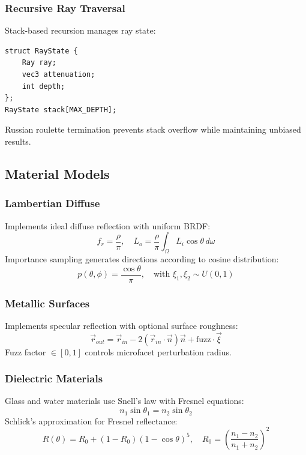 \documentclass[conference]{IEEEtran}
\begin{document}
\subsubsection{Recursive Ray Traversal}
Stack-based recursion manages ray state:
\begin{lstlisting}
struct RayState {
    Ray ray;
    vec3 attenuation;
    int depth;
};
RayState stack[MAX_DEPTH];
\end{lstlisting}
Russian roulette termination prevents stack overflow while maintaining unbiased results.

\subsection{Material Models}

\subsubsection{Lambertian Diffuse}
Implements ideal diffuse reflection with uniform BRDF:
\begin{equation}
f_r = \frac{\rho}{\pi}, \quad L_o = \frac{\rho}{\pi} \int_{\Omega} L_i \cos\theta \, d\omega
\end{equation}
Importance sampling generates directions according to cosine distribution:
\begin{equation}
p(\theta, \phi) = \frac{\cos\theta}{\pi}, \quad \text{with } \xi_1, \xi_2 \sim U(0,1)
\end{equation}

\subsubsection{Metallic Surfaces}
Implements specular reflection with optional surface roughness:
\begin{equation}
\vec{r}_{out} = \vec{r}_{in} - 2(\vec{r}_{in} \cdot \vec{n})\vec{n} + \text{fuzz} \cdot \vec{\xi}
\end{equation}
Fuzz factor $\in [0,1]$ controls microfacet perturbation radius.

\subsubsection{Dielectric Materials}
Glass and water materials use Snell's law with Fresnel equations:
\begin{equation}
n_1 \sin\theta_1 = n_2 \sin\theta_2
\end{equation}
Schlick's approximation for Fresnel reflectance:
\begin{equation}
R(\theta) = R_0 + (1-R_0)(1-\cos\theta)^5, \quad R_0 = \left(\frac{n_1-n_2}{n_1+n_2}\right)^2
\end{equation}
\end{document}
